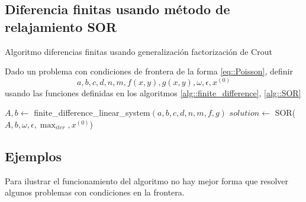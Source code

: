 \documentclass[a4paper]{article}
\begin{document}
\subsection{Diferencia finitas usando método de relajamiento SOR}
\begin{algorithm}[H]
\caption{Algoritmo diferencias finitas usando generalización factorización de Crout}\label{alg::finite_diff_Crout}
Dado un problema con condiciones de frontera de la forma \ref{eq::Poisson}, definir
\begin{equation*}
a,b,c,d,n,m,f(x,y),g(x,y),\omega,\epsilon,x^{(0)}
\end{equation*}
usando las funciones definidas en los algoritmos \ref{alg::finite_difference}, \ref{alg::SOR}
\begin{algorithmic}
\State $A, b\gets$ finite\_difference\_linear\_system$(a,b,c,d,n,m,f,g)$
\State $solution\gets $ SOR($A,b,\omega,\epsilon,\max_{iter},x^{(0)}$)
\end{algorithmic}
\end{algorithm}
\subsection{Ejemplos}
Para ilustrar el funcionamiento del algoritmo no hay mejor forma que resolver algunos problemas con condiciones en la frontera.
\end{document}
